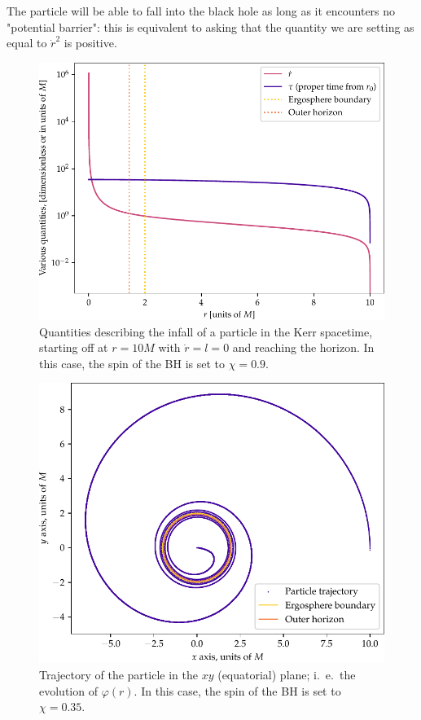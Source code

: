 \documentclass[main.tex]{subfiles}
\begin{document}
The particle will be able to fall into the black hole as long as it encounters no "potential barrier": this is equivalent to asking that the quantity we are setting as equal to \(\dot{r}^2\) is positive.

\begin{figure}[ht]
\centering
\includegraphics[width=.9\textwidth]{figures/kerr_infall}
\caption{Quantities describing the infall of a particle in the Kerr spacetime, starting off at \(r = 10M\) with \(\dot{r} = l = 0\) and reaching the horizon. In this case, the spin of the BH is set to \(\chi = 0.9\).}
\label{fig:kerr_infall}
\end{figure}

\begin{figure}[ht]
\centering
\includegraphics[width=\textwidth]{figures/kerr_trajectory}
\caption{Trajectory of the particle in the \(xy\) (equatorial) plane; i.\ e.\ the evolution of \(\varphi (r)\). In this case, the spin of the BH is set to \(\chi = 0.35\).}
\label{fig:kerr_trajectory}
\end{figure}
    
\end{document}
